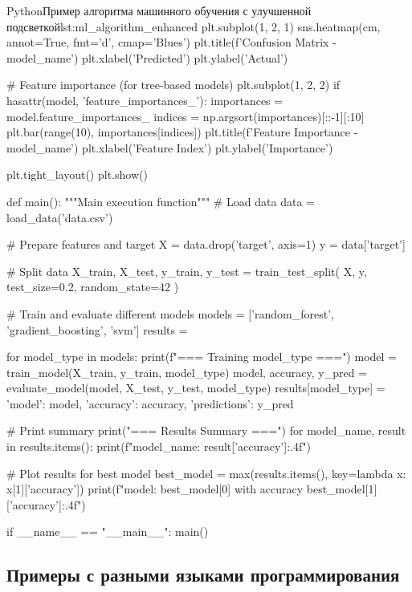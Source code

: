 \begin{CodeBlock}{Python}{Пример алгоритма машинного обучения с улучшенной подсветкой}{lst:ml_algorithm_enhanced}
    plt.subplot(1, 2, 1)
    sns.heatmap(cm, annot=True, fmt='d', cmap='Blues')
    plt.title(f'Confusion Matrix - {model_name}')
    plt.xlabel('Predicted')
    plt.ylabel('Actual')
    
    # Feature importance (for tree-based models)
    plt.subplot(1, 2, 2)
    if hasattr(model, 'feature_importances_'):
        importances = model.feature_importances_
        indices = np.argsort(importances)[::-1][:10]
        plt.bar(range(10), importances[indices])
        plt.title(f'Feature Importance - {model_name}')
        plt.xlabel('Feature Index')
        plt.ylabel('Importance')
    
    plt.tight_layout()
    plt.show()

def main():
    """Main execution function"""
    # Load data
    data = load_data('data.csv')
    
    # Prepare features and target
    X = data.drop('target', axis=1)
    y = data['target']
    
    # Split data
    X_train, X_test, y_train, y_test = train_test_split(
        X, y, test_size=0.2, random_state=42
    )
    
    # Train and evaluate different models
    models = ['random_forest', 'gradient_boosting', 'svm']
    results = {}
    
    for model_type in models:
        print(f"\n=== Training {model_type} ===")
        model = train_model(X_train, y_train, model_type)
        model, accuracy, y_pred = evaluate_model(model, X_test, y_test, model_type)
        results[model_type] = {
            'model': model,
            'accuracy': accuracy,
            'predictions': y_pred
        }
    
    # Print summary
    print("\n=== Results Summary ===")
    for model_name, result in results.items():
        print(f"{model_name}: {result['accuracy']:.4f}")
    
    # Plot results for best model
    best_model = max(results.items(), key=lambda x: x[1]['accuracy'])
    print(f"\nBest model: {best_model[0]} with accuracy {best_model[1]['accuracy']:.4f}")

if __name__ == "__main__":
    main()
\end{CodeBlock}

\subsection{Примеры с разными языками программирования}

